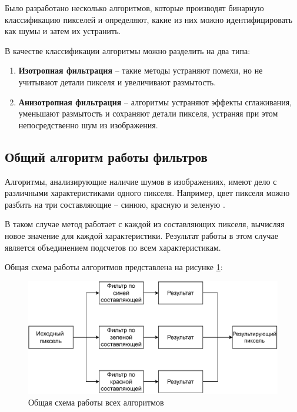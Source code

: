 Было разработано несколько алгоритмов, которые производят бинарную классификацию пикселей и определяют, какие из них можно идентифицировать как шумы и затем их устранить.

В качестве классификации алгоритмы можно разделить на два типа:
\begin{enumerate}
	\item \textbf{Изотропная фильтрация} -- такие методы устраняют помехи, но не учитывают детали пикселя и увеличивают размытость.
	\item \textbf{Анизотропная фильтрация} -- алгоритмы устраняют эффекты сглаживания, уменьшают размытость и сохраняют детали пикселя, устраняя при этом непосредственно шум из изображения.
\end{enumerate}


\subsection{Общий алгоритм работы фильтров}
Алгоритмы, анализирующие наличие шумов в изображениях, имеют дело с различными характеристиками одного пикселя.
Например, цвет пикселя можно разбить на три составляющие -- синюю, красную и зеленую \cite{color}. 

В таком случае метод работает с каждой из составляющих пикселя, вычисляя новое значение для каждой характеристики.
Результат работы в этом случае является объединением подсчетов по всем характеристикам.

Общая схема работы алгоритмов представлена на рисунке \ref{fig::allAlgs}:
\FloatBarrier
\begin{figure}[h]	
	\begin{center}
		\includegraphics[width=\linewidth]{inc/pdf/allAlgs.pdf}
	\end{center}
	\captionsetup{justification=centering}
	\caption{Общая схема работы всех алгоритмов}
	\label{fig::allAlgs}
\end{figure}
\FloatBarrier

